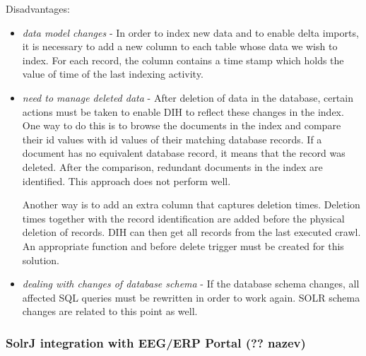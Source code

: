 \documentclass[12pt, oneside, a4paper]{book}
\begin{document}

Disadvantages:
\begin{itemize}


\item \textit{data model changes} - In order to index new data and to enable delta imports, it is necessary to add a new column to each table whose data we wish to index. 
For each record, the column contains a time stamp which holds the value of time of the last indexing activity.

\item \textit{need to manage deleted data} - After deletion of data in the database, certain actions must be taken to enable DIH to reflect these changes in the index. 
One way to do this is to browse the documents in the index and compare their id values with id values of their matching database records. 
If a document has no equivalent database record, it means that the record was deleted. 
After the comparison, redundant documents in the index are identified. 
This approach does not perform well.

Another way is to add an extra column that captures deletion times. 
Deletion times together with the record identification are added before the physical deletion of records. 
DIH can then get all records from the last executed crawl. 
An appropriate function and before delete trigger must be created for this solution. 

\item \textit{dealing with changes of database schema} - If the database schema changes, all affected SQL queries must be rewritten in order to work again. SOLR schema changes are related to this point as well. 

\end{itemize}



\subsubsection{SolrJ integration with EEG/ERP Portal (?? nazev)}
\end{document}
